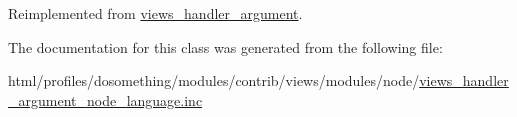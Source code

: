 Reimplemented from \hyperlink{classviews__handler__argument_a76181ac24e7be4a09aaafc1fa5f15ea1}{views\_\-handler\_\-argument}.

The documentation for this class was generated from the following file:\begin{DoxyCompactItemize}
\item 
html/profiles/dosomething/modules/contrib/views/modules/node/\hyperlink{views__handler__argument__node__language_8inc}{views\_\-handler\_\-argument\_\-node\_\-language.inc}\end{DoxyCompactItemize}
